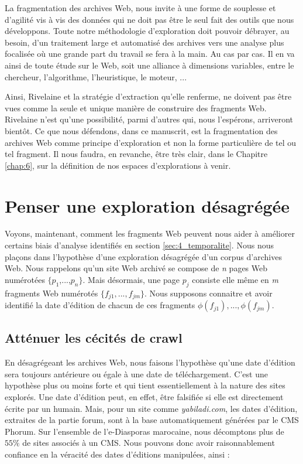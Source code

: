 \documentclass[symmetric,justified,marginals=raggedouter]{tufte-book}
\begin{document}
La fragmentation des archives Web, nous invite à une forme de souplesse et d'agilité vis à vis des données qui ne doit pas être le seul fait des outils que nous développons. Toute notre méthodologie d'exploration doit pouvoir débrayer, au besoin, d'un traitement large et automatisé des archives vers une analyse plus focalisée où une grande part du travail se fera à la main. Au cas par cas. Il en va ainsi de toute étude sur le Web, soit une alliance à dimensions variables, entre le chercheur, l'algorithme, l'heuristique, le moteur, ...  

Ainsi, Rivelaine et la stratégie d'extraction qu'elle renferme, ne doi\-vent pas être vues comme la seule et unique manière de construire des fragments Web. Rivelaine n'est qu'une possibilité, parmi d'autres qui, nous l'espérons, arriveront bientôt. Ce que nous défendons, dans ce manuscrit, est la fragmentation des archives Web comme principe d'exploration et non la forme particulière de tel ou tel fragment. Il nous faudra, en revanche, être très clair, dans le Chapitre \ref{chap:6}, sur la définition de nos espaces d'explorations à venir.    

\section{Penser une exploration désagrégée}
\label{sec:desagreger}

\noindent Voyons, maintenant, comment les fragments Web peuvent nous aider à améliorer certains biais d'analyse identifiés en section \ref{sec:4_temporalite}. Nous nous plaçons dans l'hypothèse d'une exploration désagrégée d'un corpus d'archives Web. Nous rappelons qu'un site Web archivé se compose de \textit{n} pages Web numérotées $\{p_1$,...,$p_n\}$. Mais désormais, une page $p_j$ consiste elle même en \textit{m} fragments Web numérotés $\{f_{j1},...,f_{jm}\}$. Nous supposons connaitre et avoir identifié la date d'édition de chacun de ces fragments $\phi(f_{j1}),...,\phi(f_{jm})$.

\subsection{Atténuer les cécités de crawl}

\noindent En désagrégeant les archives Web, nous faisons l'hypothèse qu'une date d'édition sera toujours antérieure ou égale à une date de téléchargement. C'est une hypothèse plus ou moins forte et qui tient essentiellement à la nature des sites explorés. Une date d'édition peut, en effet, être falsifiée si elle est directement écrite par un humain. Mais, pour un site comme \textit{yabiladi.com}, les dates d'édition, extraites de la partie forum, sont à la base automatiquement générées par le CMS Phorum. Sur l'ensemble de l'e-Diasporas marocaine, nous décomptons plus de $55\%$ de sites associés à un CMS. Nous pouvons donc avoir raisonnablement confiance en la véracité des dates d'éditions manipulées, ainsi :
\end{document}

